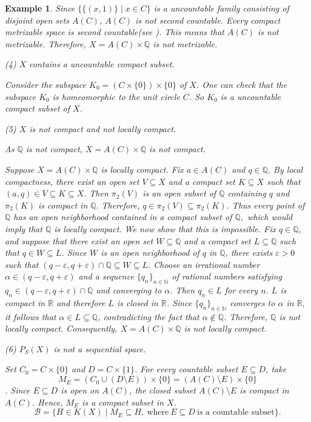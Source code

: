 \documentclass[preprint,12pt]{elsarticle}
\numberwithin{equation}{section}
\newtheorem{example}[theorem]{Example}
\begin{document}
\begin{example}
{Since $\{\{(x,1)\}\mid x\in C\}$ is a uncountable family consisting of disjoint open sets $A(C)$, $A(C)$ is not second countable. Every compact metrizable space is second countable(see \cite{RE77}). This means that $A(C)$ is not metrizable. Therefore, $X=A(C)\times\mathbb{Q}$ is not metrizable.

(4) $X$ contains a uncountable compact subset.

Consider the subspace $K_{0}=(C\times\{0\})\times\{0\}$ of $X$. One can check that the subspace $K_{0}$ is homeomorphic to the unit circle $C$. So $K_{0}$ is a uncountable compact subset of $X$.

(5) $X$ is not compact and not locally compact.

As $\mathbb{Q}$ is not compact, $X=A(C)\times\mathbb{Q}$ is not compact.


Suppose $X=A(C)\times\mathbb{Q}$ is locally compact. Fix $a\in A(C)$ and $q\in\mathbb{Q}.$
By local compactness, there exist an open set $V\subseteq X$ and a compact set $K\subseteq X$ such that $(a,q)\in V\subseteq K\subseteq X.$ Then $\pi_2(V)$ is an open subset of $\mathbb{Q}$ containing $q$ and $\pi_2(K)$ is compact in $\mathbb{Q}.$
Therefore, $q\in\pi_2(V)\subseteq\pi_2(K)$. Thus every point of $\mathbb{Q}$ has an open neighborhood contained in a compact subset of $\mathbb{Q},$ which would imply that $\mathbb{Q}$
is locally compact.  We now show that this is impossible. Fix $q\in\mathbb{Q},$ and suppose that there exist an open set $W\subseteq\mathbb{Q}$ and a compact set $L\subseteq\mathbb{Q}$
such that $q\in W\subseteq L$. Since $W$ is an open neighborhood of $q$ in $\mathbb{Q}$,
there exists $\varepsilon>0$ such that $(q-\varepsilon,q+\varepsilon)\cap\mathbb{Q}\subseteq W\subseteq L$. Choose an irrational number $\alpha\in(q-\varepsilon,q+\varepsilon)$
and a sequence $\{q_n\}_{n\in\mathbb{N}}$ of rational numbers satisfying $q_n\in(q-\varepsilon,q+\varepsilon)\cap\mathbb{Q}$ and converging to $\alpha$. Then $q_n\in L$ for every $n$. $L$ is compact in $\mathbb{R}$ and therefore $L$ is closed in $\mathbb{R}$.
Since $\{q_n\}_{n\in\mathbb{N}}$ converges to $\alpha$ in $\mathbb{R},$
it follows that $\alpha\in L\subseteq\mathbb{Q}$, contradicting the fact that $\alpha\not\in\mathbb{Q}$. Therefore, $\mathbb{Q}$ is not locally compact. Consequently, $X=A(C)\times\mathbb{Q}$ is not locally compact.



(6) $P_{S}(X)$ is not a sequential space.

Set $C_{0}=C\times\{0\}$ and $D=C\times\{1\}$. For every countable subset $E\subseteq D$, take
$$M_{E}=(C_{0}\cup(D\setminus E))\times\{0\}=(A(C)\setminus E)\times\{0\}$$.
Since $E\subseteq D$ is open on $A(C)$, the closed subset $A(C)\setminus E$ is compact in $A(C)$. Hence, $M_{E}$ is a compact subset in $X$.$$\mathcal{B}=\{H\in K(X)\mid M_{E}\subseteq H,\ \mbox{where}\ E\subseteq D\ \mbox{is a countable subset}\}.$$

}
\end{example}
\end{document}
